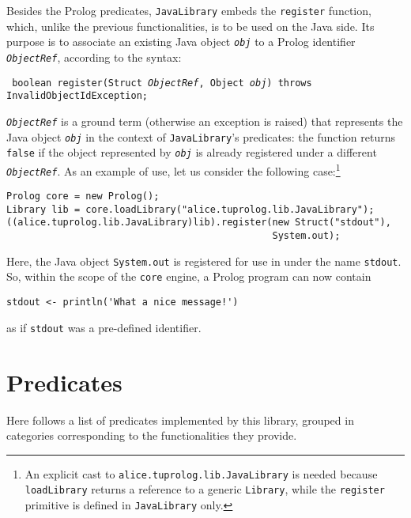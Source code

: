 Besides the Prolog predicates, \texttt{JavaLibrary} embeds the
\texttt{register} function, which, unlike the previous
functionalities, is to be used on the Java side.
%
Its purpose is to associate an existing Java object
\texttt{\textit{obj}} to a Prolog identifier
\texttt{\textit{ObjectRef}}, according to the syntax:
%
\begin{center}
 \small\tt
 boolean register(Struct \textit{ObjectRef}, Object \textit{obj})
    throws InvalidObjectIdException;\\
\end{center}
%
\texttt{\textit{ObjectRef}} is a ground term (otherwise an
exception is raised) that represents the Java object
\texttt{\textit{obj}} in the context of \texttt{JavaLibrary}'s
predicates: the function returns \texttt{false} if the object
represented by \texttt{\textit{obj}} is already registered under a
different \texttt{\textit{ObjectRef}}.
%
As an example of use, let us consider the following
case:\footnote{An
  explicit cast to \texttt{alice.tuprolog.lib.JavaLibrary} is needed because
  \texttt{loadLibrary} returns a reference to a generic
  \texttt{Library}, while the \texttt{register} primitive is defined in
  \texttt{JavaLibrary} only.}
%
{\small
\begin{verbatim}
Prolog core = new Prolog();
Library lib = core.loadLibrary("alice.tuprolog.lib.JavaLibrary");
((alice.tuprolog.lib.JavaLibrary)lib).register(new Struct("stdout"),
                                               System.out);
\end{verbatim}}
%
\noindent Here, the Java object \texttt{System.out} is registered
for use in \tuprolog{} under the name \texttt{stdout}.
%
So, within the scope of the \texttt{core} engine, a Prolog program
can now contain
\begin{verbatim}
stdout <- println('What a nice message!')
\end{verbatim}
as if \texttt{stdout} was a pre-defined \tuprolog{} identifier.

\section{Predicates}

\noindent Here follows a list of predicates implemented by this
library, grouped in categories corresponding to the functionalities
they provide.

